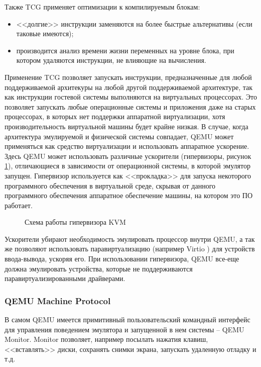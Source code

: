 Также TCG применяет оптимизации к компилируемым блокам:
\begin{itemize}
    \item <<долгие>> инструкции заменяются на более быстрые альтернативы (если таковые имеются);
    \item производится анализ времени жизни переменных на уровне блока, при котором
          удаляются инструкции, не влияющие на вычисления.
\end{itemize}

Применение TCG позволяет запускать инструкции, предназначенные для любой поддерживаемой архитекуры
на любой другой поддерживаемой архитектуре, так как инструкции гостевой системы выполняются на виртуальных процессорах.
Это позволяет запускать любые операционные системы и приложения даже на старых процессорах, в которых нет поддержки
аппаратной виртуализации, хотя производительность виртуальной машины будет крайне низкая.
В случае, когда архитектура эмулируемой и физической системы совпадает, QEMU может применяться как средство виртуализации
и использовать аппаратное ускорение.
Здесь QEMU может использовать различные ускорители (гипервизоры, рисунок \ref{fig:kvm}),
отличающиеся в зависимости от операционной системы, в которой эмулятор запущен.
Гипервизор используется как <<прокладка>> для запуска некоторого программного обеспечения в виртуальной среде,
скрывая от данного программного обеспечения аппаратное обеспечение машины, на котором это ПО работает.

\begin{figure}[!htbp]
    \centering
    
    \caption{Схема работы гипервизора KVM}\label{fig:kvm}
\end{figure}

Ускорители убирают необходимость эмулировать процессор внутри QEMU, а так же позволяют использовать
паравиртуализацию (например Virtio \cite{virtio}) для устройств ввода-вывода, ускоряя его.
При использовании гипервизора, QEMU все-еще должна эмулировать устройства, которые не поддерживаются
паравиртуализированными драйверами.


\subsubsection{QEMU Machine Protocol}\label{sec:ch1/sec4/sub3/sub2}

В самом QEMU имеется примитивный пользовательский командный интерфейс для управления поведением эмулятора
и запущенной в нем системы -- QEMU Monitor. Monitor позволяет, например
посылать нажатия клавиш, <<вставлять>> диски, сохранять снимки экрана, запускать удаленную отладку и т.д.

